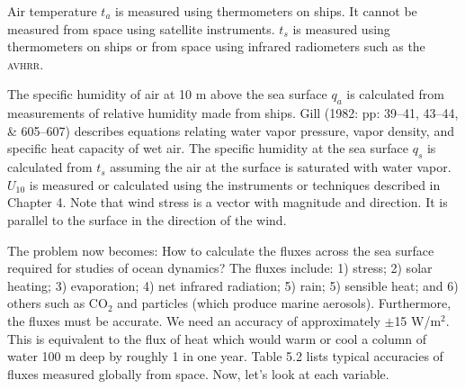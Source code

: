 Air temperature $t_a$ is measured using thermometers on ships. It
cannot be measured from space using satellite instruments. $t_s$ is
measured using thermometers on ships or from space using infrared
radiometers such as the \textsc{avhrr}.

The specific humidity of air at 10 m above the sea surface $q_a$ is
calculated from measurements of relative humidity made from
ships. Gill (1982: pp: 39--41, 43--44, \& 605--607) describes
equations relating water vapor pressure, vapor density, and specific
heat capacity of wet air. The specific humidity at the sea surface
$q_s$ is calculated from $t_s$ assuming the air at the surface is
saturated with water vapor. $U_{10}$ is measured or calculated using
the instruments or techniques described in Chapter 4. Note that wind
stress is a vector with magnitude and
direction. It is parallel to the surface in the direction of the wind.

The problem now becomes: How to calculate the fluxes across the sea
surface required for studies of ocean dynamics? The fluxes include: 1)
stress; 2) solar heating; 3) evaporation; 4) net infrared radiation;
5) rain; 5) sensible heat; and 6) others such as CO$_2$ and particles
(which produce marine aerosols). Furthermore, the fluxes must be
accurate. We need an accuracy of
approximately $\pm$15 W/m$^2$. This is equivalent to the flux of heat
which would warm or cool a column of water 100 m deep by roughly
1 in one year. Table 5.2 lists typical accuracies of fluxes
measured globally from space. Now, let's look at each variable.


